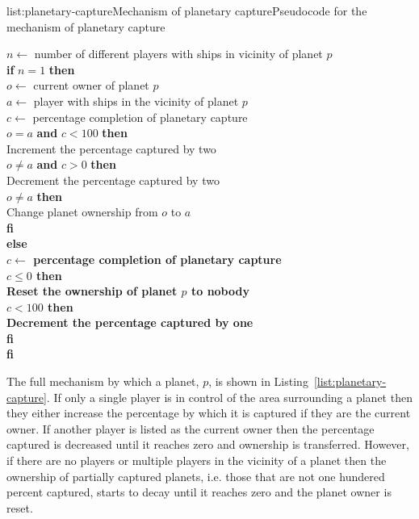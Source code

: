 \vspace{-0.5em}
\begin{listing}{list:planetary-capture}{Mechanism of planetary capture}{Pseudocode for the mechanism of planetary capture}{}
\end{listing}\vspace{-1.5em}

\begin{tabbing}
$n \leftarrow$ number of different players with ships in vicinity of planet $p$ \\
{\bf if} $n = 1$ {\bf then} \\
\quad $o \leftarrow$ current owner of planet $p$ \\
\quad $a \leftarrow$ player with ships in the vicinity of planet $p$ \\
\quad $c \leftarrow$ percentage completion of planetary capture \\
 $o = a$ {\bf and} $c < 100$ {\bf then} \\
\quad\quad Increment the percentage captured by two \\
 $o \neq a$ {\bf and} $c > 0$ {\bf then} \\
\quad\quad Decrement the percentage captured by two \\
 $o \neq a$ {\bf then} \\
\quad\quad Change planet ownership from $o$ to $a$ \\
\quad\bf fi \\
\bf else \\
\quad $c \leftarrow$ percentage completion of planetary capture \\
 $c \leq 0$ {\bf then} \\
\quad\quad Reset the ownership of planet $p$ to nobody \\
 $c < 100$ {\bf then} \\
\quad\quad Decrement the percentage captured by one \\
\quad\bf fi \\
\bf fi
\end{tabbing}
\noindent
The full mechanism by which a planet, $p$, is shown in Listing~\ref{list:planetary-capture}.
If only a single player is in control of the area surrounding a planet then they either
increase the percentage by which it is captured if they are the current owner. If another
player is listed as the current owner then the percentage captured is decreased until it
reaches zero and ownership is transferred. However, if there are no players or multiple
players in the vicinity of a planet then the ownership of partially captured planets,
i.e. those that are not one hundered percent captured, starts to decay until it reaches
zero and the planet owner is reset.
